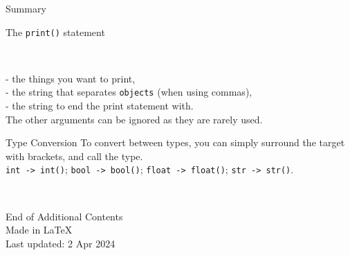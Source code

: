 \documentclass[dvipsnames, svgnames, x11names]{beamer}
\begin{document}
\begin{frame}[fragile]{Summary}
\begin{block}{The \texttt{print()} statement}

\

 - the things you want to print,\\
 - the string that separates \texttt{objects} (when using commas),\\
 - the string to end the print statement with.\\
The other arguments can be ignored as they are rarely used.
\end{block}
\begin{block}{Type Conversion}
To convert between types, you can simply surround the target with brackets, and call the type.\\
\texttt{int -> int()}; \texttt{bool -> bool()}; \texttt{float -> float()}; \texttt{str -> str()}.
\end{block}
\end{frame}

\begin{frame}{ \ }
	\begin{center}
		End of Additional Contents\\
		Made in \LaTeX\\
		Last updated: 2 Apr 2024
	\end{center}
\end{frame}
\end{document}
